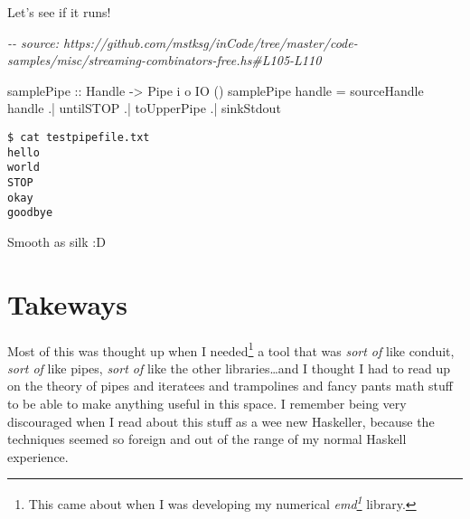 \documentclass[]{article}
\newenvironment{Shaded}{}{}
\newcommand{\CommentTok}[1]{\textcolor[rgb]{0.38,0.63,0.69}{\textit{#1}}}
\newcommand{\DataTypeTok}[1]{\textcolor[rgb]{0.56,0.13,0.00}{#1}}
\newcommand{\NormalTok}[1]{#1}
\newcommand{\OperatorTok}[1]{\textcolor[rgb]{0.40,0.40,0.40}{#1}}
\newcommand{\OtherTok}[1]{\textcolor[rgb]{0.00,0.44,0.13}{#1}}
\newcommand{\StringTok}[1]{\textcolor[rgb]{0.25,0.44,0.63}{#1}}
\renewcommand{\href}[2]{#2\footnote{\url{#1}}}
\begin{document}
Let's see if it runs!

\begin{Shaded}
\begin{Highlighting}[]
\CommentTok{{-}{-} source: https://github.com/mstksg/inCode/tree/master/code{-}samples/misc/streaming{-}combinators{-}free.hs\#L105{-}L110}

\OtherTok{samplePipe ::} \DataTypeTok{Handle} \OtherTok{{-}>} \DataTypeTok{Pipe}\NormalTok{ i o }\DataTypeTok{IO}\NormalTok{ ()}
\NormalTok{samplePipe handle }\OtherTok{=}
\NormalTok{       sourceHandle handle}
    \OperatorTok{.|}\NormalTok{ untilSTOP}
    \OperatorTok{.|}\NormalTok{ toUpperPipe}
    \OperatorTok{.|}\NormalTok{ sinkStdout}
\end{Highlighting}
\end{Shaded}

\begin{verbatim}
$ cat testpipefile.txt
hello
world
STOP
okay
goodbye
\end{verbatim}

\begin{Shaded}
\end{Shaded}

Smooth as silk :D

\hypertarget{takeways}{%
\section{Takeways}\label{takeways}}

Most of this was thought up when I needed\footnote{This came about when I was
  developing my numerical
  \emph{\href{https://hackage.haskell.org/package/emd}{emd}} library.} a tool
that was \emph{sort of} like conduit, \emph{sort of} like pipes, \emph{sort of}
like the other libraries\ldots and I thought I had to read up on the theory of
pipes and iteratees and trampolines and fancy pants math stuff to be able to
make anything useful in this space. I remember being very discouraged when I
read about this stuff as a wee new Haskeller, because the techniques seemed so
foreign and out of the range of my normal Haskell experience.
\end{document}
